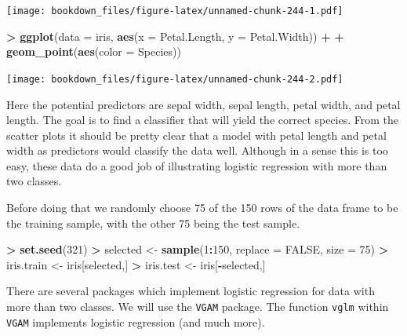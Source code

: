 \documentclass[]{krantz}
\makeatletter
\newenvironment{Shaded}{\begin{snugshade}}{\end{snugshade}}
\newcommand{\KeywordTok}[1]{\textcolor[rgb]{0.27,0.27,0.27}{\textbf{#1}}}
\newcommand{\DataTypeTok}[1]{\textcolor[rgb]{0.27,0.27,0.27}{#1}}
\newcommand{\DecValTok}[1]{\textcolor[rgb]{0.06,0.06,0.06}{#1}}
\newcommand{\StringTok}[1]{\textcolor[rgb]{0.5,0.5,0.5}{#1}}
\newcommand{\OtherTok}[1]{\textcolor[rgb]{0.37,0.37,0.37}{#1}}
\newcommand{\OperatorTok}[1]{\textcolor[rgb]{0.43,0.43,0.43}{\textbf{#1}}}
\newcommand{\NormalTok}[1]{#1}
\newenvironment{kframe}{%
\medskip{}
\setlength{\fboxsep}{.8em}
 \def\at@end@of@kframe{}%
 \ifinner\ifhmode%
  \def\at@end@of@kframe{\end{minipage}}%
  \begin{minipage}{\columnwidth}%
 \fi\fi%
 \def\FrameCommand##1{\hskip\@totalleftmargin \hskip-\fboxsep
 \colorbox{shadecolor}{##1}\hskip-\fboxsep
     \hskip-\linewidth \hskip-\@totalleftmargin \hskip\columnwidth}%
 \MakeFramed {\advance\hsize-\width
   \@totalleftmargin\z@ \linewidth\hsize
   \@setminipage}}%
 {\par\unskip\endMakeFramed%
 \at@end@of@kframe}
\renewenvironment{Shaded}{\begin{kframe}}{\end{kframe}}
\makeatother
\begin{document}
\texttt{[image: bookdown\_files/figure-latex/unnamed-chunk-244-1.pdf]}

\begin{Shaded}
\begin{Highlighting}[]
\OperatorTok{>}\StringTok{ }\KeywordTok{ggplot}\NormalTok{(}\DataTypeTok{data =}\NormalTok{ iris, }\KeywordTok{aes}\NormalTok{(}\DataTypeTok{x =}\NormalTok{ Petal.Length, }\DataTypeTok{y =}\NormalTok{ Petal.Width)) }\OperatorTok{+}\StringTok{ }
\OperatorTok{+}\StringTok{   }\KeywordTok{geom_point}\NormalTok{(}\KeywordTok{aes}\NormalTok{(}\DataTypeTok{color =}\NormalTok{ Species))}
\end{Highlighting}
\end{Shaded}

\texttt{[image: bookdown\_files/figure-latex/unnamed-chunk-244-2.pdf]}

Here the potential predictors are sepal width, sepal length, petal
width, and petal length. The goal is to find a classifier that will
yield the correct species. From the scatter plots it should be pretty
clear that a model with petal length and petal width as predictors would
classify the data well. Although in a sense this is too easy, these data
do a good job of illustrating logistic regression with more than two
classes.

Before doing that we randomly choose 75 of the 150 rows of the data
frame to be the training sample, with the other 75 being the test
sample.

\begin{Shaded}
\begin{Highlighting}[]
\OperatorTok{>}\StringTok{ }\KeywordTok{set.seed}\NormalTok{(}\DecValTok{321}\NormalTok{)}
\OperatorTok{>}\StringTok{ }\NormalTok{selected <-}\StringTok{ }\KeywordTok{sample}\NormalTok{(}\DecValTok{1}\OperatorTok{:}\DecValTok{150}\NormalTok{, }\DataTypeTok{replace =} \OtherTok{FALSE}\NormalTok{, }\DataTypeTok{size =} \DecValTok{75}\NormalTok{)}
\OperatorTok{>}\StringTok{ }\NormalTok{iris.train <-}\StringTok{ }\NormalTok{iris[selected,]}
\OperatorTok{>}\StringTok{ }\NormalTok{iris.test <-}\StringTok{ }\NormalTok{iris[}\OperatorTok{-}\NormalTok{selected,]}
\end{Highlighting}
\end{Shaded}

There are several packages which implement logistic regression for data
with more than two classes. We will use the \texttt{VGAM} package. The
function \texttt{vglm} within \texttt{VGAM} implements logistic
regression (and much more).
\end{document}
